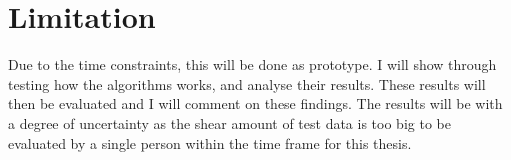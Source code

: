 \section{Limitation}
Due to the time constraints, this will be done as prototype. I will show through testing how the algorithms works, and analyse their results. These results will then be evaluated and I will comment on these findings. The results will be with a degree of uncertainty as the shear amount of test data is too big to be evaluated by a single person within the time frame for this thesis.